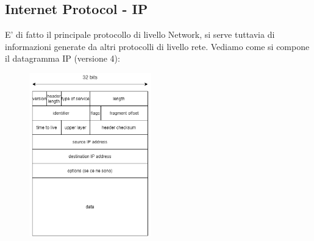 \subsection{Internet Protocol - IP}
E' di fatto il principale protocollo di livello Network, si serve tuttavia di informazioni generate da altri protocolli di livello rete.
Vediamo come si compone il datagramma IP (versione 4):
\begin{figure}[H]
    \centering
    \includegraphics[width=200px]{images/5_Internetworking/ip_datagram_format.png}
\end{figure}

